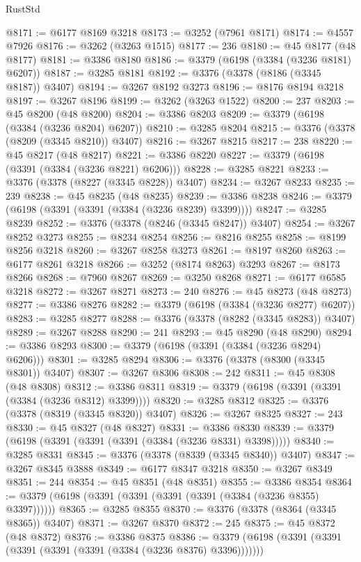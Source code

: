 \begin{lexlean}{RustStd}
\begin{coremodule}
@8171 := @6177 @8169 @3218
@8173 := @3252 (@7961 @8171)
@8174 := @4557 @7926
@8176 := @3262 (@3263 @1515)
@8177 := 236
@8180 := @45 @8177 (@48 @8177)
@8181 := @3386 @8180
@8186 := @3379 (@6198 (@3384 (@3236 @8181) @6207))
@8187 := @3285 @8181
@8192 := @3376 (@3378 (@8186 (@3345 @8187)) @3407)
@8194 := @3267 @8192 @3273
@8196 := @8176 @8194 @3218
@8197 := @3267 @8196
@8199 := @3262 (@3263 @1522)
@8200 := 237
@8203 := @45 @8200 (@48 @8200)
@8204 := @3386 @8203
@8209 := @3379 (@6198 (@3384 (@3236 @8204) @6207))
@8210 := @3285 @8204
@8215 := @3376 (@3378 (@8209 (@3345 @8210)) @3407)
@8216 := @3267 @8215
@8217 := 238
@8220 := @45 @8217 (@48 @8217)
@8221 := @3386 @8220
@8227 := @3379 (@6198 (@3391 (@3384 (@3236 @8221) @6206)))
@8228 := @3285 @8221
@8233 := @3376 (@3378 (@8227 (@3345 @8228)) @3407)
@8234 := @3267 @8233
@8235 := 239
@8238 := @45 @8235 (@48 @8235)
@8239 := @3386 @8238
@8246 := @3379 (@6198 (@3391 (@3391 (@3384 (@3236 @8239) @3399))))
@8247 := @3285 @8239
@8252 := @3376 (@3378 (@8246 (@3345 @8247)) @3407)
@8254 := @3267 @8252 @3273
@8255 := @8234 @8254
@8256 := @8216 @8255
@8258 := @8199 @8256 @3218
@8260 := @3267 @8258 @3273
@8261 := @8197 @8260
@8263 := @6177 @8261 @3218
@8266 := @3252 (@8174 @8263) @3293
@8267 := @8173 @8266
@8268 := @7960 @8267
@8269 := @3250 @8268
@8271 := @6177 @6585 @3218
@8272 := @3267 @8271
@8273 := 240
@8276 := @45 @8273 (@48 @8273)
@8277 := @3386 @8276
@8282 := @3379 (@6198 (@3384 (@3236 @8277) @6207))
@8283 := @3285 @8277
@8288 := @3376 (@3378 (@8282 (@3345 @8283)) @3407)
@8289 := @3267 @8288
@8290 := 241
@8293 := @45 @8290 (@48 @8290)
@8294 := @3386 @8293
@8300 := @3379 (@6198 (@3391 (@3384 (@3236 @8294) @6206)))
@8301 := @3285 @8294
@8306 := @3376 (@3378 (@8300 (@3345 @8301)) @3407)
@8307 := @3267 @8306
@8308 := 242
@8311 := @45 @8308 (@48 @8308)
@8312 := @3386 @8311
@8319 := @3379 (@6198 (@3391 (@3391 (@3384 (@3236 @8312) @3399))))
@8320 := @3285 @8312
@8325 := @3376 (@3378 (@8319 (@3345 @8320)) @3407)
@8326 := @3267 @8325
@8327 := 243
@8330 := @45 @8327 (@48 @8327)
@8331 := @3386 @8330
@8339 := @3379 (@6198 (@3391 (@3391 (@3391 (@3384 (@3236 @8331) @3398)))))
@8340 := @3285 @8331
@8345 := @3376 (@3378 (@8339 (@3345 @8340)) @3407)
@8347 := @3267 @8345 @3888
@8349 := @6177 @8347 @3218
@8350 := @3267 @8349
@8351 := 244
@8354 := @45 @8351 (@48 @8351)
@8355 := @3386 @8354
@8364 := @3379 (@6198 (@3391 (@3391 (@3391 (@3391 (@3384 (@3236 @8355) @3397))))))
@8365 := @3285 @8355
@8370 := @3376 (@3378 (@8364 (@3345 @8365)) @3407)
@8371 := @3267 @8370
@8372 := 245
@8375 := @45 @8372 (@48 @8372)
@8376 := @3386 @8375
@8386 := @3379 (@6198 (@3391 (@3391 (@3391 (@3391 (@3391 (@3384 (@3236 @8376) @3396)))))))

\end{coremodule}
\end{lexlean}
